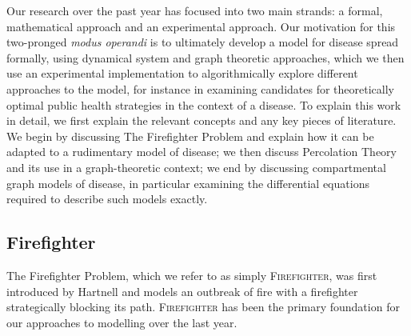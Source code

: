 \documentclass[../report.tex]{subfiles}
\begin{document}
Our research over the past year has focused into two main strands: a formal, mathematical approach and an experimental approach. Our motivation for this two-pronged {\it modus operandi} is to ultimately develop a model for disease spread formally, using dynamical system and graph theoretic approaches, which we then use an experimental implementation to algorithmically explore different approaches to the model, for instance in examining candidates for theoretically optimal public health strategies in the context of a disease. To explain this work in detail, we first explain the relevant concepts and any key pieces of literature. We begin by discussing The Firefighter Problem and explain how it can be adapted to a rudimentary model of disease; we then discuss Percolation Theory and its use in a graph-theoretic context; we end by discussing compartmental graph models of disease, in particular examining the differential equations required to describe such models exactly.

\subsection{Firefighter}

The Firefighter Problem, which we refer to as simply {\scshape Firefighter}, was first introduced by Hartnell \cite{hartnell_1995} and models an outbreak of fire with a firefighter strategically blocking its path. {\scshape Firefighter} has been the primary foundation for our approaches to modelling over the last year.
\end{document}
